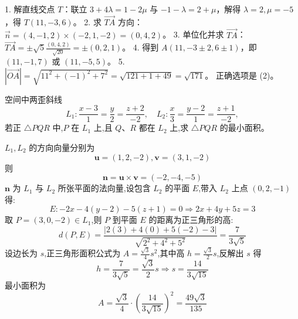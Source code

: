 \begin{questions}
\begin{solution}
1. 解直线交点 $T$：联立 $3+4\lambda = 1-2\mu$ 与 $-1-\lambda = 2+\mu$，解得 $\lambda=2, \mu=-5$，得 $T(11, -3, 6)$。
2. 求 $\vec{TA}$ 方向：$\vec{n} = (4,-1,2) \times (-2,1,-2) = (0, 4, 2)$。
3. 单位化并求 $\vec{TA}$：$\vec{TA} = \pm \sqrt{5} \frac{(0,4,2)}{\sqrt{20}} = \pm (0, 2, 1)$。
4. 得到 $A(11, -3 \pm 2, 6 \pm 1)$，即 $(11, -1, 7)$ 或 $(11, -5, 5)$。
5. $|\vec{OA}| = \sqrt{11^2 + (-1)^2 + 7^2} = \sqrt{121+1+49} = \sqrt{171}$。
正确选项是 (2)。
\end{solution}
    \question 空间中两歪斜线 $$L_1: \frac{x-3}{1} = \frac{y}{2} = \frac{z+2}{-2},\quad L_2: \frac{x}{3} = \frac{y-2}{1} = \frac{z+1}{-2},$$若正 $\triangle PQR$ 中,$P$ 在 $L_1$ 上,且 $Q$、$R$ 都在 $L_2$ 上,求 $\triangle PQR$ 的最小面积。
    \begin{solution}
        $L_1,L_2$ 的方向向量分别为
        \[
        \textbf{u} = (1,2,-2) ,\textbf{v} = (3,1,-2) 
        \]
        则\[
        \textbf{n} = \textbf{u} \times \textbf{v} = (-2, -4, -5)
        \]
        $\textbf{n}$ 为 $L_1$ 与 $L_2$ 所张平面的法向量,设包含 $L_2$ 的平面 $E$,带入 $L_2$ 上点 $(0,2,-1)$ 得:
        \[
        E: -2x -4(y-2) -5(z+1) = 0 \Rightarrow 2x + 4y + 5z = 3
        \]
        取 $P = (3,0,-2) \in L_1$,则 $P$ 到平面 $E$ 的距离为正三角形的高:
        \[
        d(P,E) = \frac{|2(3) + 4(0) + 5(-2) - 3|}{\sqrt{2^2 + 4^2 + 5^2}} = \frac{7}{3\sqrt{5}}
        \]
        设边长为 $s$,正三角形面积公式为 $A = \frac{\sqrt{3}}{4}s^2$,其中高 $h = \frac{\sqrt{3}}{2}s$,反解出 $s$ 得
        \[
        h = \frac{7}{3\sqrt{5}} = \frac{\sqrt{3}}{2}s \Rightarrow s = \frac{14}{3\sqrt{15}}
        \]
        最小面积为\[
        A = \frac{\sqrt{3}}{4} \cdot \left( \frac{14}{3\sqrt{15}} \right)^2 = \frac{49\sqrt{3}}{135}
        \]
    \end{solution}


\end{questions}
